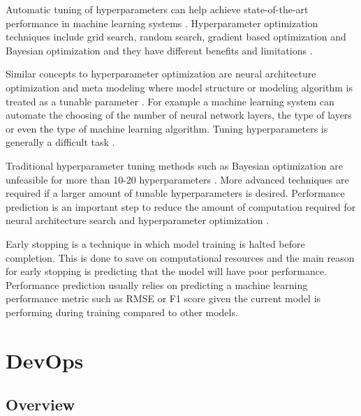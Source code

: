 Automatic tuning of hyperparameters can help achieve state-of-the-art performance in machine learning systems \parencite{maclaurinGradientbasedHyperparameterOptimization2015}.
Hyperparameter optimization techniques include grid search, random search, gradient based optimization and Bayesian optimization and they have different benefits and limitations \parencite{yangHyperparameterOptimizationMachine2020}.

Similar concepts to hyperparameter optimization are neural architecture optimization and meta modeling where model structure or modeling algorithm is treated as a tunable parameter \parencite{bakerAcceleratingNeuralArchitecture2017}.
For example a machine learning system can automate the choosing of the number of neural network layers, the type of layers or even the type of machine learning algorithm.
Tuning hyperparameters is generally a difficult task \parencite{maclaurinGradientbasedHyperparameterOptimization2015}.

Traditional hyperparameter tuning methods such as Bayesian optimization are unfeasible for more than 10-20 hyperparameters \parencite{maclaurinGradientbasedHyperparameterOptimization2015}.
More advanced techniques are required if a larger amount of tunable hyperparameters is desired.
Performance prediction is an important step to reduce the amount of computation required for neural architecture search and hyperparameter optimization \parencite{bakerAcceleratingNeuralArchitecture2017}.

Early stopping is a technique in which model training is halted before completion. %
This is done to save on computational resources and the main reason for early stopping is predicting that the model will have poor performance. %
Performance prediction usually relies on predicting a machine learning performance metric such as RMSE or F1 score given the current model is performing during training compared to other models. %

\section{DevOps} %
\label{sec:devops}

\subsection{Overview}

